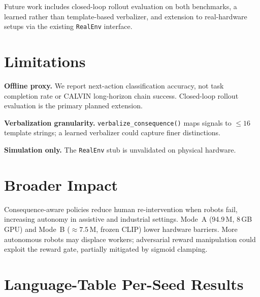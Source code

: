 \documentclass{article}
\begin{document}
Future work includes closed-loop rollout evaluation on both benchmarks,
a learned rather than template-based verbalizer, and extension to real-hardware
setups via the existing \texttt{RealEnv} interface.

\section*{Limitations}
\label{sec:limitations}

\textbf{Offline proxy.}
We report next-action classification accuracy, not task completion rate or
CALVIN long-horizon chain success.
Closed-loop rollout evaluation is the primary planned extension.

\textbf{Verbalization granularity.}
\texttt{verbalize\_consequence()} maps signals to $\le16$ template strings;
a learned verbalizer could capture finer distinctions.

\textbf{Simulation only.}
The \texttt{RealEnv} stub is unvalidated on physical hardware.

\section*{Broader Impact}

Consequence-aware policies reduce human re-intervention when robots fail,
increasing autonomy in assistive and industrial settings.
Mode~A (94.9\,M, 8\,GB GPU) and Mode~B (${\approx}7.5$\,M, frozen CLIP) lower
hardware barriers.
More autonomous robots may displace workers; adversarial reward manipulation
could exploit the reward gate, partially mitigated by sigmoid clamping.

\clearpage
{}

\clearpage


\clearpage
\appendix

\section{Language-Table Per-Seed Results}
\label{app:lt_full}
\end{document}
